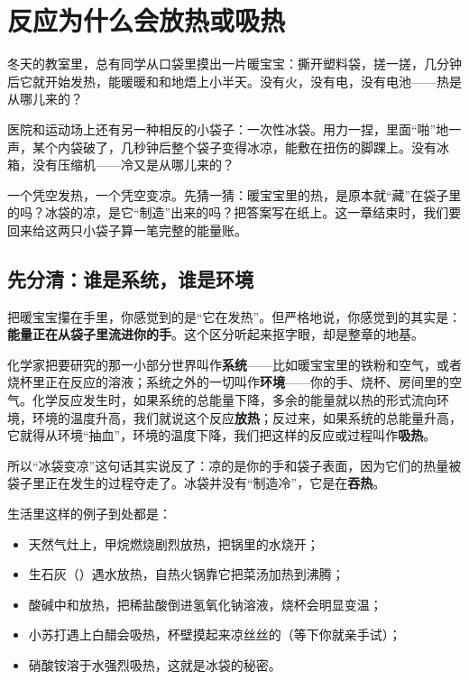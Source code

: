 \chapter{反应为什么会放热或吸热}

\begin{kaichang}
冬天的教室里，总有同学从口袋里摸出一片暖宝宝：撕开塑料袋，搓一搓，几分钟后它就开始发热，能暖暖和和地焐上小半天。没有火，没有电，没有电池——热是从哪儿来的？

医院和运动场上还有另一种相反的小袋子：一次性冰袋。用力一捏，里面“啪”地一声，某个内袋破了，几秒钟后整个袋子变得冰凉，能敷在扭伤的脚踝上。没有冰箱，没有压缩机——冷又是从哪儿来的？

一个凭空发热，一个凭空变凉。先猜一猜：暖宝宝里的热，是原本就“藏”在袋子里的吗？冰袋的凉，是它“制造”出来的吗？把答案写在纸上。这一章结束时，我们要回来给这两只小袋子算一笔完整的能量账。
\end{kaichang}

\section{先分清：谁是系统，谁是环境}

把暖宝宝攥在手里，你感觉到的是“它在发热”。但严格地说，你感觉到的其实是：\textbf{能量正在从袋子里流进你的手}。这个区分听起来抠字眼，却是整章的地基。

化学家把要研究的那一小部分世界叫作\textbf{系统}——比如暖宝宝里的铁粉和空气，或者烧杯里正在反应的溶液；系统之外的一切叫作\textbf{环境}——你的手、烧杯、房间里的空气。化学反应发生时，如果系统的总能量下降，多余的能量就以热的形式流向环境，环境的温度升高，我们就说这个反应\textbf{放热}；反过来，如果系统的总能量升高，它就得从环境“抽血”，环境的温度下降，我们把这样的反应或过程叫作\textbf{吸热}。

所以“冰袋变凉”这句话其实说反了：凉的是你的手和袋子表面，因为它们的热量被袋子里正在发生的过程夺走了。冰袋并没有“制造冷”，它是在\textbf{吞热}。

生活里这样的例子到处都是：

\begin{itemize}[itemsep=2pt]
\item 天然气灶上，甲烷燃烧剧烈放热，把锅里的水烧开；
\item 生石灰（）遇水放热，自热火锅靠它把菜汤加热到沸腾；
\item 酸碱中和放热，把稀盐酸倒进氢氧化钠溶液，烧杯会明显变温；
\item 小苏打遇上白醋会吸热，杯壁摸起来凉丝丝的（等下你就亲手试）；
\item 硝酸铵溶于水强烈吸热，这就是冰袋的秘密。
\end{itemize}


